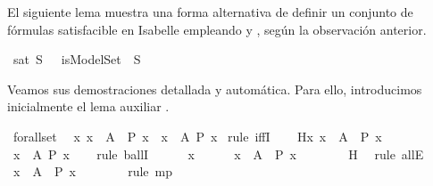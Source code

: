 \begin{isabellebody}
\begin{isamarkuptext}
  El siguiente lema muestra una forma alternativa de definir
  un conjunto de fórmulas satisfacible en Isabelle empleando 
   y , según la observación anterior.%
\end{isamarkuptext}\isamarkuptrue%
\isamarkupfalse%
\ {\isachardoublequoteopen}sat\ S\ {\isasymequiv}\ {\isasymexists}{\isasymA}{\isachardot}\ isModelSet\ {\isasymA}\ S{\isachardoublequoteclose}\isanewline
%
\isadelimproof
\ \ %
\endisadelimproof
%
\isatagproof
{}\isamarkupfalse%
%
\endisatagproof
{\isafoldproof}%
%
\isadelimproof
%
\endisadelimproof
%
\begin{isamarkuptext}%
Veamos sus demostraciones detallada y automática. Para ello, 
  introducimos inicialmente el lema auxiliar .%
\end{isamarkuptext}\isamarkuptrue%
\isamarkupfalse%
\ forall{\isacharunderscore}set{\isacharcolon}\isanewline
\ \ {\isachardoublequoteopen}{\isacharparenleft}{\isasymforall}x{\isachardot}\ {\isacharparenleft}x\ {\isasymin}\ A\ {\isasymlongrightarrow}\ P\ x{\isacharparenright}{\isacharparenright}\ {\isacharequal}\ {\isacharparenleft}{\isasymforall}x\ {\isasymin}\ A{\isachardot}\ P\ x{\isacharparenright}{\isachardoublequoteclose}\isanewline
%
\isadelimproof
%
\endisadelimproof
%
\isatagproof
{}\isamarkupfalse%
\ {\isacharparenleft}rule\ iffI{\isacharparenright}\isanewline
\ \ \isamarkupfalse%
\ H{}{\isacharcolon}{\isachardoublequoteopen}{\isasymforall}x{\isachardot}\ {\isacharparenleft}x\ {\isasymin}\ A\ {\isasymlongrightarrow}\ P\ x{\isacharparenright}{\isachardoublequoteclose}\isanewline
\ \ \isamarkupfalse%
\ {\isachardoublequoteopen}{\isasymforall}x\ {\isasymin}\ A{\isachardot}\ P\ x{\isachardoublequoteclose}\isanewline
\ \ \isamarkupfalse%
\ {\isacharparenleft}rule\ ballI{\isacharparenright}\isanewline
\ \ \ \ \isamarkupfalse%
\ x\isanewline
\ \ \ \ \isamarkupfalse%
\ {\isachardoublequoteopen}x\ {\isasymin}\ A\ {\isasymlongrightarrow}\ P\ x{\isachardoublequoteclose}\isanewline
\ \ \ \ \ \ \isamarkupfalse%
\ H{}\ \isamarkupfalse%
\ {\isacharparenleft}rule\ allE{\isacharparenright}\isanewline
\ \ \ \ \isamarkupfalse%
\ {\isachardoublequoteopen}x\ {\isasymin}\ A\ {\isasymLongrightarrow}\ P\ x{\isachardoublequoteclose}\isanewline
\ \ \ \ \ \ \isamarkupfalse%
\ {\isacharparenleft}rule\ mp{\isacharparenright}\isanewline

\end{isabellebody}
